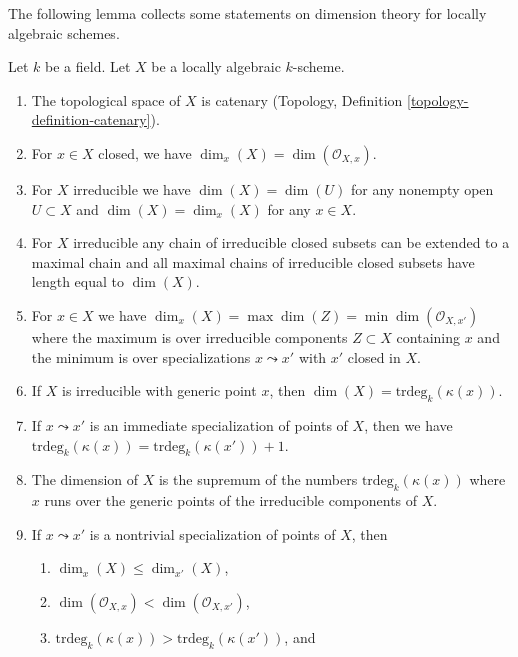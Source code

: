 \noindent
The following lemma collects some statements on dimension theory for locally
algebraic schemes.

\begin{lemma}
\label{lemma-dimension-locally-algebraic}
Let $k$ be a field. Let $X$ be a locally algebraic $k$-scheme.
\begin{enumerate}
\item
\label{item-catenary}
The topological space of $X$ is catenary
(Topology, Definition \ref{topology-definition-catenary}).
\item
\label{item-dimension-at-closed-point}
For $x \in X$ closed, we have $\dim_x(X) = \dim(\mathcal{O}_{X, x})$.
\item
\label{item-dimension-irreducible}
For $X$ irreducible we have $\dim(X) = \dim(U)$ for any
nonempty open $U \subset X$ and $\dim(X) = \dim_x(X)$
for any $x \in X$.
\item
\label{item-irreducible-maximal-chains}
For $X$ irreducible any chain of irreducible closed subsets can be
extended to a maximal chain and all maximal chains of irreducible
closed subsets have length equal to $\dim(X)$.
\item
\label{item-dimension-irreducibles-passing-through}
For $x \in X$ we have
$\dim_x(X) = \max \dim(Z) = \min \dim(\mathcal{O}_{X, x'})$
where the maximum is over irreducible components
$Z \subset X$ containing $x$ and the minimum is over
specializations $x \leadsto x'$ with $x'$ closed in $X$.
\item
\label{item-dimension-irreducible-trdeg}
If $X$ is irreducible with generic point $x$, then
$\dim(X) = \text{trdeg}_k(\kappa(x))$.
\item
\label{item-immediate-specialization}
If $x \leadsto x'$ is an immediate specialization
of points of $X$, then we have
$\text{trdeg}_k(\kappa(x)) = \text{trdeg}_k(\kappa(x')) + 1$.
\item
\label{item-dimension-sup-trdeg}
The dimension of $X$ is the supremum of the numbers
$\text{trdeg}_k(\kappa(x))$ where $x$ runs over the
generic points of the irreducible components of $X$.
\item
\label{item-specialization}
If $x \leadsto x'$ is a nontrivial specialization of points of $X$, then
\begin{enumerate}
\item $\dim_x(X) \leq \dim_{x'}(X)$,
\item $\dim(\mathcal{O}_{X, x}) < \dim(\mathcal{O}_{X, x'})$,
\item $\text{trdeg}_k(\kappa(x)) > \text{trdeg}_k(\kappa(x'))$, and

\end{enumerate}
\end{enumerate}
\end{lemma}
